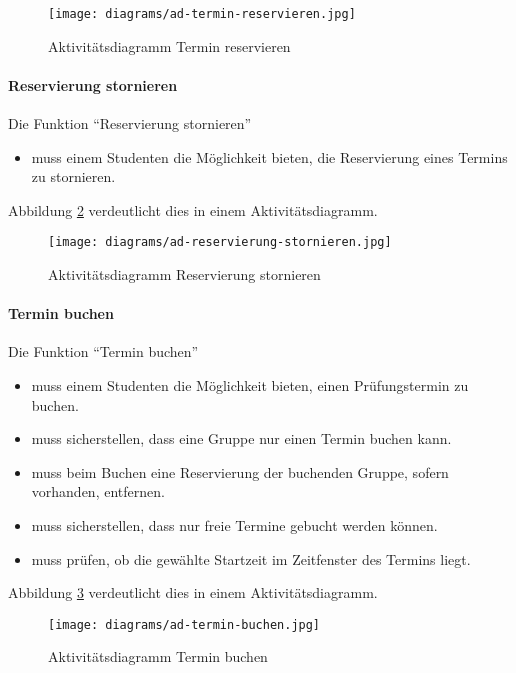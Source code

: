 \begin{figure}
  \centering
  \texttt{[image: diagrams/ad-termin-reservieren.jpg]}
  \caption{Aktivitätsdiagramm Termin reservieren}
  \label{fig:ad-termin-reservieren}
\end{figure}

\paragraph{Reservierung stornieren}

Die Funktion ``Reservierung stornieren''
\begin{itemize}
  \item muss einem Studenten die Möglichkeit bieten, die Reservierung eines Termins zu stornieren.
\end{itemize}

Abbildung \ref{fig:ad-reservierung-stornieren} verdeutlicht dies in einem Aktivitätsdiagramm.

\begin{figure}
  \centering
  \texttt{[image: diagrams/ad-reservierung-stornieren.jpg]}
  \caption{Aktivitätsdiagramm Reservierung stornieren}
  \label{fig:ad-reservierung-stornieren}
\end{figure}

\paragraph{Termin buchen}

Die Funktion ``Termin buchen''
\begin{itemize}
  \item muss einem Studenten die Möglichkeit bieten, einen Prüfungstermin zu buchen.
  \item muss sicherstellen, dass eine Gruppe nur einen Termin buchen kann.
  \item muss beim Buchen eine Reservierung der buchenden Gruppe, sofern vorhanden, entfernen.
  \item muss sicherstellen, dass nur freie Termine gebucht werden können.
  \item muss prüfen, ob die gewählte Startzeit im Zeitfenster des Termins liegt.
\end{itemize}

Abbildung \ref{fig:ad-termin-buchen} verdeutlicht dies in einem Aktivitätsdiagramm.

\begin{figure}
  \centering
  \texttt{[image: diagrams/ad-termin-buchen.jpg]}
  \caption{Aktivitätsdiagramm Termin buchen}
  \label{fig:ad-termin-buchen}
\end{figure}

